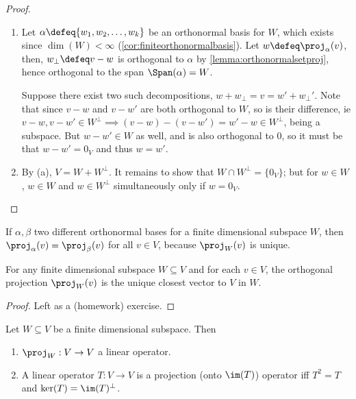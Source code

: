 \begin{proof}
    \begin{enumerate}[label=(\alph*)]
        \item {} Let $\alpha \defeq \{w_1, w_2, \dots, w_k\}$ be an orthonormal basis for $W$, which exists since $\dim(W) < \infty$ (\cref{cor:finiteorthonormalbasis}). Let $w \defeq \proj_\alpha(v)$, then, $w_\perp \defeq v - w$ is orthogonal to $\alpha$ by \cref{lemma:orthonormalsetproj}, hence orthogonal to the span $\Span(\alpha) = W$.
        
         Suppose there exist two such decompositions, $w + w_\perp = v = w' + w_\perp'$. Note that since $v - w$ and $v - w'$ are both orthogonal to $W$, so is their difference, ie $v -w,  v - w' \in W^\perp \implies (v- w) - (v - w')  = w' - w\in W^\perp$, being a subspace. But $w - w' \in W$ as well, and is also orthogonal to $0$, so it must be that $w - w' = 0_V$ and thus $w = w'$.
        
        \item By (a), $V = W + W^\perp$. It remains to show that $W \cap W^\perp =\{0_V\}$; but for $w \in W$, $w \in W$ and $w \in W^\perp$ simultaneously only if $w = 0_V$.
    \end{enumerate}
\end{proof}

\begin{remark}
    If $\alpha, \beta$ two different orthonormal bases for a finite dimensional subspace $W$, then $\proj_\alpha(v) = \proj_\beta(v)$ for all $v \in V$, because $\proj_W(v)$ is unique.
\end{remark}

\begin{theorem}
    For any finite dimensional subspace $W \subseteq V$ and for each $v \in V$, the orthogonal projection $\proj_W(v)$ is the unique closest vector to $V$ in $W$.
\end{theorem}

\begin{proof}
    Left as a (homework) exercise.
\end{proof}

\begin{proposition}
    Let $W \subseteq V$ be a finite dimensional subspace. Then \begin{enumerate}[label=(\alph*)]
        \item $\proj_W: V \to V$ a linear operator.
        \item A linear operator $T : V \to V$ is a projection (onto $\im(T)$) operator iff $T^2 = T$ and $\ker(T) = \im(T)^\perp$.
    \end{enumerate}
\end{proposition}


